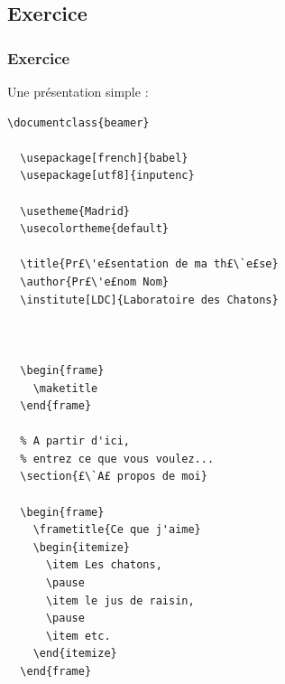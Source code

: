 \subsection{Exercice}

\begin{frame}[fragile]
  \frametitle{Exercice}

Une présentation simple :

\begin{lstlisting}[multicols=2]
  \documentclass{beamer}

  \usepackage[french]{babel}
  \usepackage[utf8]{inputenc}

  \usetheme{Madrid}
  \usecolortheme{default}

  \title{Pr£\'e£sentation de ma th£\`e£se}
  \author{Pr£\'e£nom Nom}
  \institute[LDC]{Laboratoire des Chatons}

  

  \begin{frame}
    \maketitle
  \end{frame}

  % A partir d'ici,
  % entrez ce que vous voulez...
  \section{£\`A£ propos de moi}

  \begin{frame}
    \frametitle{Ce que j'aime}
    \begin{itemize}
      \item Les chatons,
      \pause
      \item le jus de raisin,
      \pause
      \item etc.
    \end{itemize}
  \end{frame}

  
\end{lstlisting}

\end{frame}


